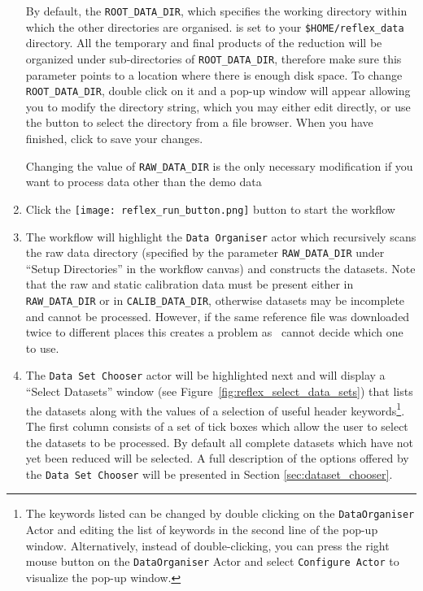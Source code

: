 \begin{enumerate}
  By default, the {\tt ROOT\_DATA\_DIR}, which specifies the working
  directory within which the other directories are organised. is set
  to your {\tt \$HOME/reflex\_data} directory. All the temporary and
  final products of the reduction will be organized under
  sub-directories of {\tt ROOT\_DATA\_DIR}, therefore make sure this
  parameter points to a location where there is enough disk space. To
  change {\tt ROOT\_DATA\_DIR}, double click on it and a pop-up window
  will appear allowing you to modify the directory string, which you
  may either edit directly, or use the  button to
  select the directory from a file browser.  When you have finished,
  click  to save your changes.

    Changing the value of {\tt RAW\_DATA\_DIR} is the only necessary
    modification if you want to process data other than the demo data

  \item Click the 
  \texttt{[image: reflex\_run\_button.png]}
  button to start the workflow

\item The workflow will highlight the {\tt Data Organiser} actor which
  recursively scans the raw data directory (specified by the parameter
  {\tt RAW\_DATA\_DIR} under ``Setup Directories'' in the workflow
  canvas) and constructs the datasets. Note that the raw and static
  calibration data must be present either in {\tt RAW\_DATA\_DIR} or
  in {\tt CALIB\_DATA\_DIR}, otherwise datasets may be incomplete and
  cannot be processed. However, if the same reference file was
  downloaded twice to different places this creates a problem as
  \ cannot decide which one to use.

\item The {\tt Data Set Chooser} actor will be highlighted next and
  will display a ``Select Datasets'' window (see
  Figure~\ref{fig:reflex_select_data_sets}) that lists the datasets
  along with the values of a selection of useful header
  keywords\footnote{The keywords listed can be changed by double
    clicking on the {\tt DataOrganiser} Actor and editing the list of
    keywords in the second line of the pop-up window. Alternatively,
    instead of double-clicking, you can press the right mouse button
    on the {\tt DataOrganiser} Actor and select {\tt Configure Actor} to
    visualize the pop-up window.}.  The first column consists of a set
  of tick boxes which allow the user to select the datasets to be
  processed. By default all complete datasets which have not yet been
  reduced will be selected. A full description of the options
    offered by the {\tt Data Set Chooser} will be presented in Section
    \ref{sec:dataset_chooser}.


\end{enumerate}
